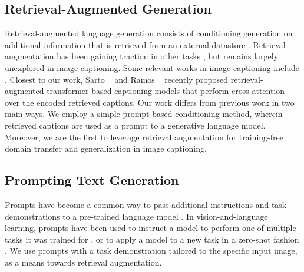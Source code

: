 \documentclass[10pt,twocolumn,letterpaper]{article}
\begin{document}

\subsection{Retrieval-Augmented Generation}

Retrieval-augmented language generation consists of conditioning generation on additional information that is retrieved from an external datastore \cite{rag}. Retrieval augmentation has been gaining traction in other tasks \cite{li2022survey,izacard2022few}, but remains largely unexplored in image captioning. Some relevant works in image captioning include \cite{app10186235, Xu2019AUG,ramos2021retrieval, sarto2022retrieval, ramos2023retrieval}.
Closest to our work, Sarto \etal~\cite{sarto2022retrieval} and Ramos \etal~\cite{ramos2023retrieval}  recently proposed retrieval-augmented transformer-based captioning models that perform cross-attention over the encoded retrieved captions. Our work differs from previous work in two main ways. We employ a simple prompt-based conditioning method, wherein retrieved captions are used as a prompt to a generative language model. Moreover, we are the first to leverage retrieval augmentation for training-free domain transfer and generalization in image captioning.


\subsection{Prompting Text Generation}
Prompts have become a common way to pass additional instructions and task demonstrations to a pre-trained language model \cite{radford2019language}.
In vision-and-language learning, prompts have been used to instruct a model to perform one of multiple tasks it was trained for \cite{li2022blip}, or to apply a model to a new task in a zero-shot fashion \cite{frozen,jin2021good}. %
We use prompts with a task demonstration tailored to the specific input image, as a means towards retrieval augmentation.
\end{document}
